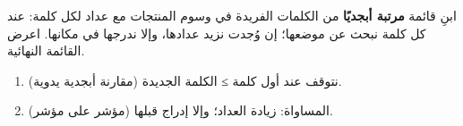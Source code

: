 \begin{statement}
ابنِ قائمة \textbf{مرتبة أبجديًا} من الكلمات الفريدة في وسوم المنتجات مع عداد لكل كلمة: عند كل كلمة نبحث عن موضعها؛ إن وُجدت نزيد عدادها، وإلا ندرجها في مكانها. اعرض القائمة النهائية.
\end{statement}
\begin{stepsbox}\begin{enumerate}
\item نتوقف عند أول كلمة ≥ الكلمة الجديدة (مقارنة أبجدية يدوية).
\item المساواة: زيادة العداد؛ وإلا إدراج قبلها (مؤشر على مؤشر).
\end{enumerate}\end{stepsbox}
